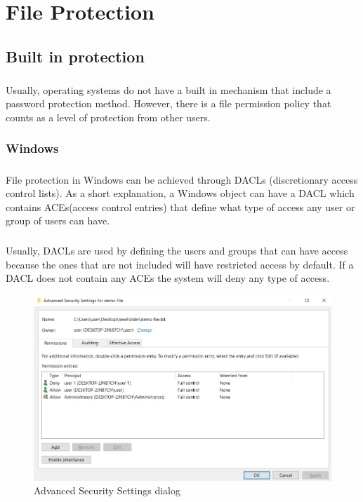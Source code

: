 \chapter{File Protection}
	\section{Built in protection}
	\paragraph{}
	Usually, operating systems do not have a built in mechanism that include a password protection method. However, there is a file permission policy that counts as a level of protection from other users.
	
	\subsection{Windows}
	\paragraph{}
	File protection in Windows can be achieved through DACLs (discretionary access control lists). As a short explanation, a Windows object can have a DACL which contains ACEs(access control entries) that define what type of access any user or group of users can have\cite{MDSNDACsLACEs}.
	
	\paragraph{}
	Usually, DACLs are used by defining the users and groups that can have access because the ones that are not included will have restricted access by default. If a DACL does not contain any ACEs the system will deny any type of access.
	
	\begin{figure}[h!]
		\includegraphics[width=\linewidth]{images/securitySettings.jpg}
		\caption{Advanced Security Settings dialog}
		\label{fig:securitySettings}
	\end{figure}
	
